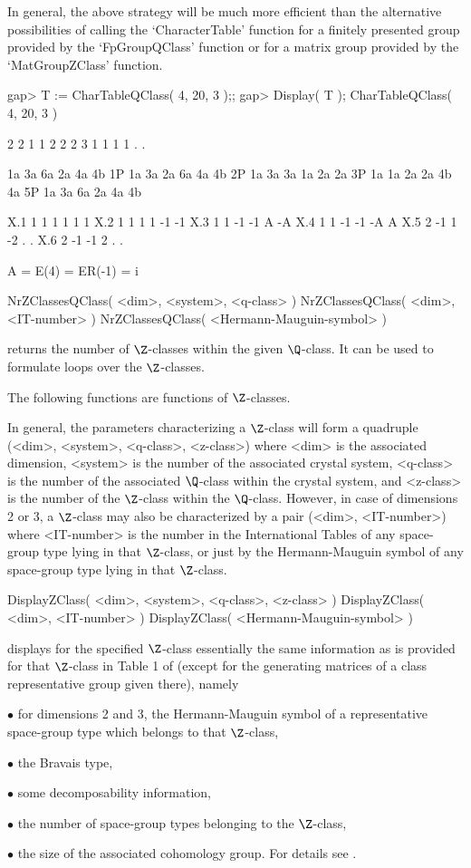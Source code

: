 In general, the above strategy will be much more efficient than the
alternative possibilities of calling the `CharacterTable' function for a
finitely presented group provided by the `FpGroupQClass' function or
for a matrix group provided by the `MatGroupZClass' function.

\beginexample
gap> T := CharTableQClass( 4, 20, 3 );;
gap> Display( T );
CharTableQClass( 4, 20, 3 )

     2  2  1  1  2  2  2
     3  1  1  1  1  .  .

       1a 3a 6a 2a 4a 4b
    1P 1a 3a 2a 6a 4a 4b
    2P 1a 3a 3a 1a 2a 2a
    3P 1a 1a 2a 2a 4b 4a
    5P 1a 3a 6a 2a 4a 4b

X.1     1  1  1  1  1  1
X.2     1  1  1  1 -1 -1
X.3     1  1 -1 -1  A -A
X.4     1  1 -1 -1 -A  A
X.5     2 -1  1 -2  .  .
X.6     2 -1 -1  2  .  .

A = E(4)
  = ER(-1) = i
\endexample


\>NrZClassesQClass( <dim>, <system>, <q-class> )
\>NrZClassesQClass( <dim>, <IT-number> )
\>NrZClassesQClass( <Hermann-Mauguin-symbol> )

returns the number of $\Z$-classes within the given $\Q$-class. It can
be used to formulate loops over the $\Z$-classes.

The following functions are functions of $\Z$-classes.

In general, the parameters characterizing a $\Z$-class will form a
quadruple (<dim>, <system>, <q-class>, <z-class>) where <dim> is the
associated dimension, <system> is the number of the associated crystal
system, <q-class> is the number of the associated $\Q$-class within
the crystal system, and <z-class> is the number of the $\Z$-class
within the $\Q$-class.  However, in case of dimensions 2 or 3, a
$\Z$-class may also be characterized by a pair (<dim>, <IT-number>)
where <IT-number> is the number in the International Tables
\cite{Hah95} of any space-group type lying in that $\Z$-class, or just
by the Hermann-Mauguin symbol of any space-group type lying in that
$\Z$-class.

\>DisplayZClass( <dim>, <system>, <q-class>, <z-class> )
\>DisplayZClass( <dim>, <IT-number> )
\>DisplayZClass( <Hermann-Mauguin-symbol> )

displays for the specified $\Z$-class essentially the same information
as is provided for that $\Z$-class in Table 1 of \cite{BBNWZ78}
(except for the generating matrices of a class representative group
given there), namely
\beginlist%
\item{$\bullet$} for  dimensions 2 and 3, the  Hermann-Mauguin symbol of a
    representative space-group type  which belongs  to that $\Z$-class,
\item{$\bullet$} the Bravais type,
\item{$\bullet$} some decomposability information,
\item{$\bullet$} the number of space-group types belonging to the $\Z$-class,
\item{$\bullet$} the size of the associated cohomology group.
\endlist
For details see \cite{BBNWZ78}.

